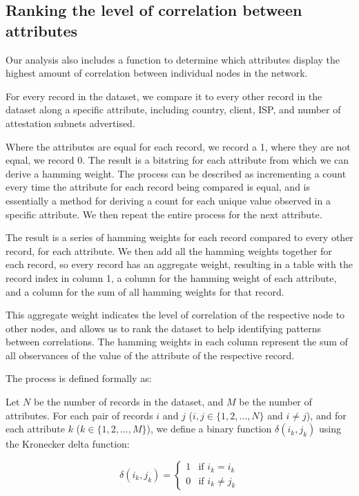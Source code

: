 \documentclass[conference]{IEEEtran}
\begin{document}
\subsection{Ranking the level of correlation between attributes}
\label{sec:ranking-the-level-of-correlation-between-attributes}

Our analysis also includes a function to determine which attributes display the highest amount of correlation between individual nodes in the network.

For every record in the dataset, we compare it to every other record in the dataset along a specific attribute, including country, client, ISP, and number of attestation subnets advertised.

Where the attributes are equal for each record, we record a 1, where they are not equal, we record 0.
The result is a bitstring for each attribute from which we can derive a hamming weight.
The process can be described as incrementing a count every time the attribute for each record being compared is equal, and is essentially a method for deriving a count for each unique value observed in a specific attribute. We then repeat the entire process for the next attribute.

The result is a series of hamming weights for each record compared to every other record, for each attribute. We then add all the hamming weights together for each record, so every record has an aggregate weight, resulting in a table with the record index in column 1, a column for the hamming weight of each attribute, and a column for the sum of all hamming weights for that record.

This aggregate weight indicates the level of correlation of the respective node to other nodes, and allows us to rank the dataset to help identifying patterns between correlations. The hamming weights in each column represent the sum of all observances of the value of the attribute of the respective record.

The process is defined formally as:

Let \( N \) be the number of records in the dataset, and \( M \) be the number of attributes.  For each pair of records \( i \) and \( j \) (\( i, j \in \{1, 2, \ldots, N\} \) and \( i \neq j \)), and for each attribute \( k \) (\( k \in \{1, 2, \ldots, M\} \)), we define a binary function \( \delta \left( i_k,j_k \right) \) using the Kronecker delta function:

\[
\delta \left( i_k,j_k \right) = \begin{cases} 1 & \text{if } i_k = i_k \\ 0 & \text{if } i_k \neq j_k \end{cases}
\]
\end{document}
